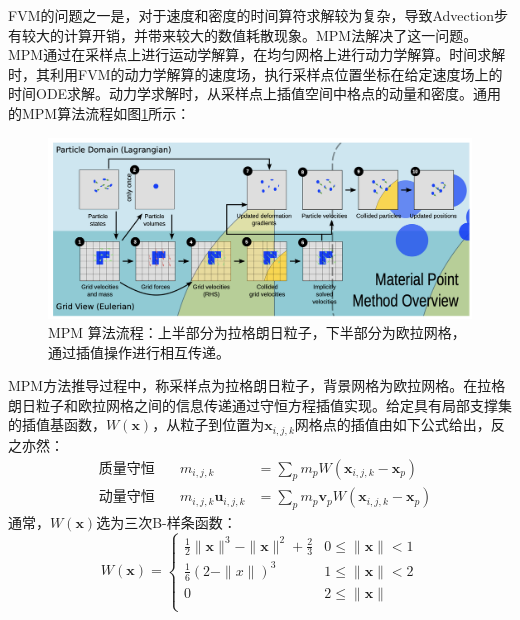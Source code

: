 FVM的问题之一是，对于速度和密度的时间算符求解较为复杂，导致Advection步有较大的计算开销，并带来较大的数值耗散现象。MPM法解决了这一问题。MPM通过在采样点上进行运动学解算，在均匀网格上进行动力学解算。时间求解时，其利用FVM的动力学解算的速度场，执行采样点位置坐标在给定速度场上的时间ODE求解。动力学求解时，从采样点上插值空间中格点的动量和密度。通用的MPM算法流程如图\ref{fig:mpm-overview}所示：
\begin{figure}[hbt]
  \centering
  \includegraphics[width=0.98\linewidth]{img/Screenshot 2023-04-19 at 19.55.25.png}
  \caption{MPM 算法流程：上半部分为拉格朗日粒子，下半部分为欧拉网格，通过插值操作进行相互传递。}\label{fig:mpm-overview}
\end{figure}

MPM方法推导过程中，称采样点为拉格朗日粒子，背景网格为欧拉网格。在拉格朗日粒子和欧拉网格之间的信息传递通过守恒方程插值实现。给定具有局部支撑集的插值基函数，$W(\mathbf x)$，从粒子到位置为$\mathbf x_{i,j,k}$网格点的插值由如下公式给出，反之亦然：
\begin{equation}\label{eq:mpm-transf}
\begin{aligned}
  &\text{质量守恒}\quad & m_{i,j,k} &= \sum_{p} m_{p} W(\mathbf x_{i,j,k}- \mathbf x_p)\\
  &\text{动量守恒}\quad & m_{i,j,k}\mathbf u_{i,j,k} &= \sum_{p} m_{p} \mathbf v_{p}W(\mathbf x_{i,j,k}- \mathbf x_p)
\end{aligned}
\end{equation}
通常，$W(\mathbf x)$选为三次B-样条函数：
\begin{equation}
  W(\mathbf x) = \begin{cases}
    \frac{1}{2}\| \mathbf x\| ^3 - \| \mathbf x\|^2 +\frac{2}{3} & 0 \le \| \mathbf x\| < 1\\
    \frac{1}{6}\left(2 -\| x \| \right)^3 & 1 \le \| \mathbf x\| < 2\\
    0 & 2 \le \| \mathbf x\|\\
  \end{cases}
\end{equation}

